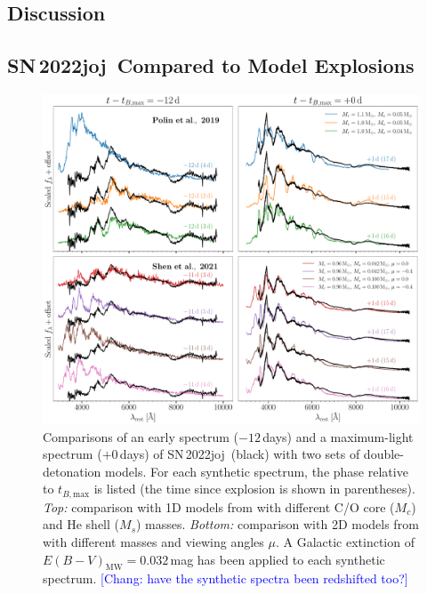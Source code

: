 \documentclass[twocolumn]{aastex631}
\newcommand{\sn}{SN\,2022joj}
\newcommand{\chang}[1]{\textcolor{blue}{[Chang: #1]}}
\begin{document}
\begin{CJK*}{UTF8}{gbsn}
\section{Discussion} \label{sec:discussion}
\subsection{\sn\ Compared to Model Explosions} \label{sec:model}

\begin{figure}
    \centering
    \includegraphics[width=\linewidth]{model_comparison_spec.pdf}
    \caption{Comparisons of an early spectrum ($-12$\,days) and a maximum-light spectrum ($+0$\,days) of \sn\ (black) with two sets of double-detonation models. For each synthetic spectrum, the phase relative to $t_{B,\mathrm{max}}$  is listed (the time since explosion is shown in parentheses). \textit{Top:} comparison with 1D models from \citet{polin_observational_2019} with different C/O core ($M_c$) and He shell ($M_s$) masses. \textit{Bottom:} comparison with 2D models from \citet{Shen_2D_2021} with different masses and viewing angles $\mu$. A Galactic extinction of ${E(B-V)_\mathrm{MW}}=0.032$\,mag has been applied to each synthetic spectrum. \chang{have the synthetic spectra been redshifted too?}}
    \label{fig:model_spec}
\end{figure}


\end{CJK*}
\end{document}
